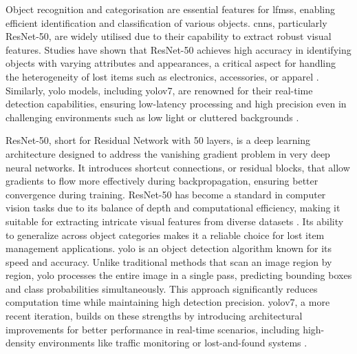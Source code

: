 Object recognition and categorisation are essential features for \acp{lfms}, enabling efficient identification and classification of various objects. \acp{cnn}, particularly ResNet-50, are widely utilised due to their capability to extract robust visual features. Studies have shown that ResNet-50 achieves high accuracy in identifying objects with varying attributes and appearances, a critical aspect for handling the heterogeneity of lost items such as electronics, accessories, or apparel \cites{Prawira2024, Ghazal2016, Liu2022}. Similarly, \ac{yolo} models, including \ac{yolo}v7, are renowned for their real-time detection capabilities, ensuring low-latency processing and high precision even in challenging environments such as low light or cluttered backgrounds \cites{Sharma2024, Vedanth2024}.

ResNet-50, short for Residual Network with 50 layers, is a deep learning architecture designed to address the vanishing gradient problem in very deep neural networks. It introduces shortcut connections, or residual blocks, that allow gradients to flow more effectively during backpropagation, ensuring better convergence during training. ResNet-50 has become a standard in computer vision tasks due to its balance of depth and computational efficiency, making it suitable for extracting intricate visual features from diverse datasets \cite{He2015}. Its ability to generalize across object categories makes it a reliable choice for lost item management applications. \ac{yolo} is an object detection algorithm known for its speed and accuracy. Unlike traditional methods that scan an image region by region, \ac{yolo} processes the entire image in a single pass, predicting bounding boxes and class probabilities simultaneously. This approach significantly reduces computation time while maintaining high detection precision. \ac{yolo}v7, a more recent iteration, builds on these strengths by introducing architectural improvements for better performance in real-time scenarios, including high-density environments like traffic monitoring or lost-and-found systems \cites{Redmon2015, Wang2022}.

